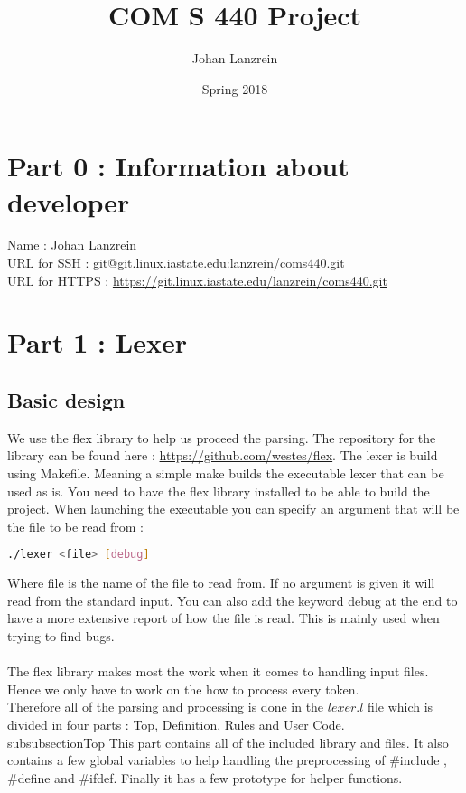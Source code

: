 \documentclass{article}
\title{COM S 440 Project}
\author{Johan Lanzrein}
\date{Spring 2018}
\begin{document}
\maketitle

\section{Part 0 : Information about developer}

Name : Johan Lanzrein \\
URL for SSH : \url{git@git.linux.iastate.edu:lanzrein/coms440.git} \\
URL for HTTPS : \url{https://git.linux.iastate.edu/lanzrein/coms440.git}



\section{Part 1 : Lexer}
\subsection{Basic design}
We use the flex library to help us proceed the parsing. The repository for the library can be found here : \url{https://github.com/westes/flex}. The lexer is build using Makefile. Meaning a simple make builds the executable lexer that can be used as is. You need to have the flex library installed to be able to build the project. 
When launching the executable you can specify an argument that will be the file to be read from :  \begin{lstlisting}[language=bash]
./lexer <file> [debug]
\end{lstlisting}
Where file is the name of the file to read from. If no argument is given it will read from the standard input. You can also add the keyword debug at the end to have a more extensive report of how the file is read. This is mainly used when trying to find bugs. \\ \\
The flex library makes most the work when it comes to handling input files. Hence we only have to work on the how to process every token. \\ Therefore all of the parsing and processing is done in the $lexer.l$ file which is divided in four parts : Top, Definition, Rules and User Code.
\\subsubsection{Top}
This part contains all of the included library and files. 
It also contains a few global variables to help handling the preprocessing of \#include , \#define and \#ifdef. 
Finally it has a few prototype for helper functions. 
\end{document}

